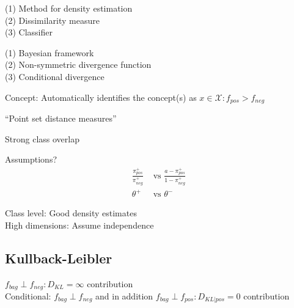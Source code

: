 \noindent (1) Method for density estimation\\
(2) Dissimilarity measure \\
(3) Classifier

\noindent (1) Bayesian framework\\
(2) Non-symmetric divergence function \\
(3) Conditional divergence

Concept: Automatically identifies the concept(s) as $x \in \mathcal{X}: f_{pos} > f_{neg}$

``Point set distance measures''

Strong class overlap

Assumptions?\\
\begin{align}
  \frac{\pi_{pos}^+}{\pi_{neg}^+} & \text{ vs } \frac{a-\pi_{pos}^+}{1-\pi_{neg}^+} \\
  \theta^+ & \text{ vs } \theta^-
\end{align}

Class level: Good density estimates\\
High dimensions: Assume independence

\subsection{Kullback-Leibler} 

$f_{bag} \perp f_{neg} : D_{KL} = \infty$ contribution \\
Conditional: $f_{bag} \perp f_{neg}$ and in addition $f_{bag} \perp f_{pos} : D_{KL|pos} = 0$ contribution